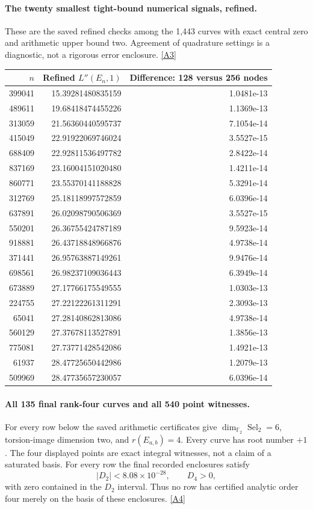 \documentclass[11pt]{article}
\newcommand{\srcref}[1]{\hyperlink{source:#1}{[#1]}}
\begin{document}
\paragraph{The twenty smallest tight-bound numerical signals, refined.}
These are the saved refined checks among the 1,443 curves with exact central
zero and arithmetic upper bound two. Agreement of quadrature settings is a
diagnostic, not a rigorous error enclosure. \srcref{A3}
\begin{center}\small
\begin{tabular}{r r r}
\toprule
$n$ & Refined $L''(E_n,1)$ & Difference: 128 versus 256 nodes\\
\midrule
399041 & 15.39281480835159 & 1.0481e-13\\
489611 & 19.68418474455226 & 1.1369e-13\\
313059 & 21.56360440595737 & 7.1054e-14\\
415049 & 22.91922069746024 & 3.5527e-15\\
688409 & 22.92811536497782 & 2.8422e-14\\
837169 & 23.16004151020480 & 1.4211e-14\\
860771 & 23.55370141188828 & 5.3291e-14\\
312769 & 25.18118997572859 & 6.0396e-14\\
637891 & 26.02098790506369 & 3.5527e-15\\
550201 & 26.36755424787189 & 9.5923e-14\\
918881 & 26.43718848966876 & 4.9738e-14\\
371441 & 26.95763887149261 & 9.9476e-14\\
698561 & 26.98237109036443 & 6.3949e-14\\
673889 & 27.17766175549555 & 1.0303e-13\\
224755 & 27.22122261311291 & 2.3093e-13\\
65041 & 27.28140862813086 & 4.9738e-14\\
560129 & 27.37678113527891 & 1.3856e-13\\
775081 & 27.73771428542086 & 1.4921e-13\\
61937 & 28.47725650442986 & 1.2079e-13\\
509969 & 28.47735657230057 & 6.0396e-14\\
\bottomrule
\end{tabular}
\end{center}
\paragraph{All 135 final rank-four curves and all 540 point witnesses.}
For every row below the saved arithmetic certificates give
$\dim_{\mathbb F_2}\operatorname{Sel}_2=6$, torsion-image dimension two,
and $r(E_{a,b})=4$. Every curve has root number $+1$. The four displayed
points are exact integral witnesses, not a claim of a saturated basis.
For every row the final recorded enclosures satisfy
\[
 |D_2|<8.08\times10^{-28},\qquad D_4>0,
\]
with zero contained in the $D_2$ interval. Thus no row has certified analytic
order four merely on the basis of these enclosures. \srcref{A4}
\end{document}
